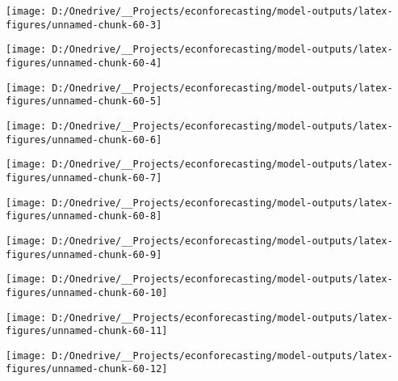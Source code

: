 \documentclass[11pt, letterpaper]{article}\usepackage[]{graphicx}\usepackage[]{color}
\begin{document}
{\centering \texttt{[image: D:/Onedrive/\_\_Projects/econforecasting/model-outputs/latex-figures/unnamed-chunk-60-3]} 

}




{\centering \texttt{[image: D:/Onedrive/\_\_Projects/econforecasting/model-outputs/latex-figures/unnamed-chunk-60-4]} 

}




{\centering \texttt{[image: D:/Onedrive/\_\_Projects/econforecasting/model-outputs/latex-figures/unnamed-chunk-60-5]} 

}




{\centering \texttt{[image: D:/Onedrive/\_\_Projects/econforecasting/model-outputs/latex-figures/unnamed-chunk-60-6]} 

}




{\centering \texttt{[image: D:/Onedrive/\_\_Projects/econforecasting/model-outputs/latex-figures/unnamed-chunk-60-7]} 

}




{\centering \texttt{[image: D:/Onedrive/\_\_Projects/econforecasting/model-outputs/latex-figures/unnamed-chunk-60-8]} 

}




{\centering \texttt{[image: D:/Onedrive/\_\_Projects/econforecasting/model-outputs/latex-figures/unnamed-chunk-60-9]} 

}




{\centering \texttt{[image: D:/Onedrive/\_\_Projects/econforecasting/model-outputs/latex-figures/unnamed-chunk-60-10]} 

}




{\centering \texttt{[image: D:/Onedrive/\_\_Projects/econforecasting/model-outputs/latex-figures/unnamed-chunk-60-11]} 

}




{\centering \texttt{[image: D:/Onedrive/\_\_Projects/econforecasting/model-outputs/latex-figures/unnamed-chunk-60-12]} 

}
\end{document}
